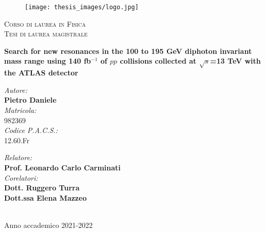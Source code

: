\documentclass[a4paper, oneside, 11pt, openright]{book}
\begin{document}
	\begin{titlepage}
		\begin{figure}
			\texttt{[image: thesis\_images/logo.jpg]}
		\end{figure}
		\begin{center}
			\textsc{\large Corso di laurea in Fisica}\\[0.2cm]
			\textsc{\normalsize Tesi di laurea magistrale}\\[2cm]
			
			\begin{doublespace}
				\textbf{\LARGE Search for new resonances in the 100 to 195 GeV diphoton invariant mass range using 140 fb$^{-1}$ of $pp$ collisions collected at $\sqrt{s}$=13 TeV with the ATLAS detector}
				\\[2cm]
			\end{doublespace}
			
			\begin{minipage}{0.4\textwidth}
				\begin{flushleft}
					\emph{Autore:} \\[0mm]
					\textbf{Pietro Daniele} \\[4mm]
					\emph{Matricola:}\\
					982369 \\[4mm]
					\emph{Codice P.A.C.S.:}\\[0mm]
					12.60.Fr
				\end{flushleft}
			\end{minipage}
			\begin{minipage}{0.4\textwidth}
				\begin{flushright} 
					\emph{Relatore:} \\
					\textbf{Prof. Leonardo Carlo Carminati} \\[1.2em]
					\emph{Corelatori:} \\
					\textbf{Dott. Ruggero Turra} \\
					\textbf{Dott.ssa Elena Mazzeo} \\[1.2em]
				\end{flushright}
			\end{minipage}\\[2cm]
			\vfill
			Anno accademico 2021-2022
		\end{center}
		
		
	\end{titlepage}
	
\end{document}

